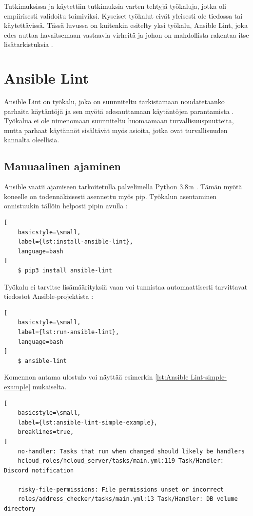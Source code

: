 Tutkimuksissa \parencite{RahmanAkond2019TSSS} ja \parencite{RahmanAkond2021SSiA} käytettiin
tutkimuksia varten tehtyjä työkaluja, jotka oli empiirisesti validoitu toimiviksi.
Kyseiset työkalut eivät yleisesti ole tiedossa tai käytettävissä. Tässä luvussa on
kuitenkin esitelty yksi työkalu, Ansible Lint, joka edes auttaa havaitsemaan vastaavia
virheitä ja johon on mahdollista rakentaa itse lisätarkistuksia \parencite{SestoVincent2020ATaV}.

\section{Ansible Lint}

Ansible Lint on työkalu, joka on suunniteltu tarkistamaan noudatetaanko parhaita
käytäntöjä ja sen myötä edesauttamaan käytäntöjen parantamista \parencite{GithubAnsibleLint}.
Työkalua ei ole nimenomaan suunniteltu huomaamaan turvallisuuspuutteita, mutta parhaat
käytännöt sisältävät myös asioita, jotka ovat turvallisuuden kannalta oleellisia.

\subsection{Manuaalinen ajaminen}

Ansible vaatii ajamiseen tarkoitetulla palvelimella Python 3.8:n \parencite{AnsibleDocs}.
Tämän myötä koneelle on todennäköisesti asennettu myös pip. Työkalun asentaminen
onnistuukin tällöin helposti pipin avulla \parencite{AnsibleLintReadTheDocs}:

\begin{lstlisting}[
    basicstyle=\small,
    label={lst:install-ansible-lint},
    language=bash
]
    $ pip3 install ansible-lint
\end{lstlisting}

Työkalu ei tarvitse lisämäärityksiä vaan voi tunnistaa automaattisesti tarvittavat
tiedostot Ansible-projektista \parencite{AnsibleLintReadTheDocs}:

\begin{lstlisting}[
    basicstyle=\small,
    label={lst:run-ansible-lint},
    language=bash
]
    $ ansible-lint
\end{lstlisting}

Komennon antama ulostulo voi näyttää esimerkin \ref{lst:Ansible Lint-simple-example} mukaiselta.

\begin{lstlisting}[
    basicstyle=\small,
    label={lst:ansible-lint-simple-example},
    breaklines=true,
]
    no-handler: Tasks that run when changed should likely be handlers
    hcloud_roles/hcloud_server/tasks/main.yml:119 Task/Handler: Discord notification

    risky-file-permissions: File permissions unset or incorrect
    roles/address_checker/tasks/main.yml:13 Task/Handler: DB volume directory
\end{lstlisting}

